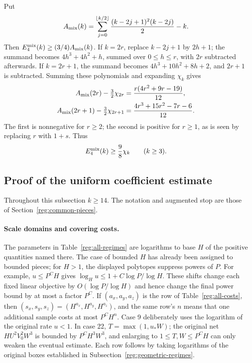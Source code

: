 \documentclass[11pt]{amsart}
\theoremstyle{definition}
\theoremstyle{remark}
\numberwithin{equation}{section}
\begin{document}
Put
\[
A_{\rm mix}(k)=\sum_{j=0}^{\lfloor k/2\rfloor}\frac{(k-2j+1)^2(k-2j)}2-k.
\]
Then $E_4^{\rm mix}(k)\ge(3/4)A_{\rm mix}(k)$. If $k=2r$, replace $k-2j+1$ by $2h+1$; the summand becomes $4h^3+4h^2+h$, summed over $0\le h\le r$, with $2r$ subtracted afterwards. If $k=2r+1$, the summand becomes $4h^3+10h^2+8h+2$, and $2r+1$ is subtracted. Summing these polynomials and expanding $\chi_k$ gives
\begin{align*}
A_{\rm mix}(2r)-\tfrac32\chi_{2r}&=\frac{r(4r^2+9r-19)}{12},\\
A_{\rm mix}(2r+1)-\tfrac32\chi_{2r+1}&=\frac{4r^3+15r^2-7r-6}{12}.
\end{align*}
The first is nonnegative for $r\ge2$; the second is positive for $r\ge1$, as is seen by replacing $r$ with $1+s$. Thus
\begin{equation}\label{reg:eq:mixed-bound}
E_4^{\rm mix}(k)\ge\frac98\chi_k\qquad(k\ge3).
\end{equation}



\subsection{Proof of the uniform coefficient estimate}\label{reg:uniform}\label{reg:statement}\label{reg:scale-tables}

Throughout this subsection $k\ge14$. The notation and augmented stop are those of Section~\ref{reg:common-pieces}.
\paragraph{Scale domains and covering costs.}

The parameters in Table~\ref{reg:all-regimes} are logarithms to base $H$ of the positive quantities named there. The case of bounded $H$ has already been assigned to bounded pieces; for $H>1$, the displayed polytopes suppress powers of $P$. For example, $u\le P^CH$ gives $\log_Hu\le1+C\log P/\log H$. These shifts change each fixed linear objective by $O(\log P/\log H)$ and hence change the final power bound by at most a factor $P^C$. If $(a_x,a_y,a_z)$ is the row of Table~\ref{reg:all-costs}, then $(s_x,s_y,s_z)=(H^{a_x},H^{a_y},H^{a_z})$, and the same row's $n$ means that one additional sample costs at most $P^CH^n$. Case 9 deliberately uses the logarithm of the original rate $u<1$. In case 22, $T=\max(1,u_*W)$; the original net $HU^2V_0^2W^3$ is bounded by $P^CH^3W^3$, and enlarging to $1\le T,W\le P^CH$ can only weaken the eventual estimate. Each row follows by taking logarithms of the original boxes established in Subsection~\ref{reg:geometric-regimes}.
\end{document}
